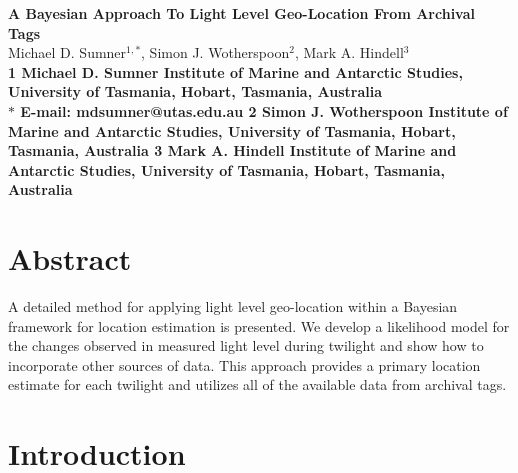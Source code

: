 \documentclass[10pt]{article}
\date{}
\begin{document}
\begin{flushleft}
{\Large
\textbf{A Bayesian Approach To Light Level Geo-Location From Archival Tags}
}
\\
Michael D. Sumner$^{1,\ast}$, 
Simon J. Wotherspoon$^{2}$, 
Mark A. Hindell$^{3}$
\\
\bf{1} Michael D. Sumner Institute of Marine and Antarctic Studies,
University of Tasmania, Hobart, Tasmania, Australia\\
$\ast$ E-mail: mdsumner@utas.edu.au
\bf{2} Simon J. Wotherspoon Institute of Marine and Antarctic Studies,
University of Tasmania, Hobart, Tasmania, Australia
\bf{3} Mark A. Hindell Institute of Marine and Antarctic Studies,
University of Tasmania, Hobart, Tasmania, Australia

\end{flushleft}

\section*{Abstract}
A detailed method for applying light level geo-location within a
Bayesian framework for location estimation is presented. We develop a
likelihood model for the changes observed in measured light level
during twilight and show how to incorporate other sources of
data. This approach provides a primary location estimate for each
twilight and utilizes all of the available data from archival tags.


\section*{Introduction}
\end{document}
